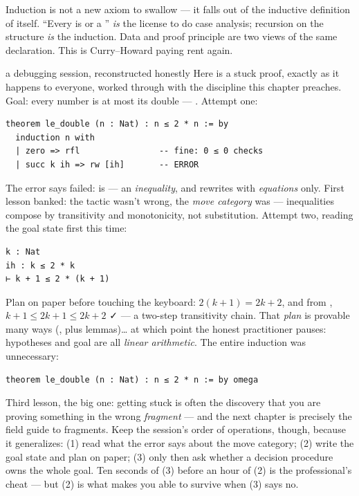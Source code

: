 \begin{aha}
Induction is not a new axiom to swallow --- it falls out of the inductive
definition of  itself. ``Every  is  or a
'' \emph{is} the license to do case analysis; recursion on the
structure \emph{is} the induction. Data and proof principle are two views of
the same declaration. This is Curry--Howard paying rent again.
\end{aha}

\begin{worked}{a debugging session, reconstructed honestly}
Here is a stuck proof, exactly as it happens to everyone, worked
through with the discipline this chapter preaches. Goal: every number
is at most its double --- . Attempt one:
\begin{lstlisting}[language=Lean]
theorem le_double (n : Nat) : n ≤ 2 * n := by
  induction n with
  | zero => rfl                -- fine: 0 ≤ 0 checks
  | succ k ih => rw [ih]       -- ERROR
\end{lstlisting}
The error says  failed:  is
 --- an \emph{inequality}, and  rewrites with
\emph{equations} only. First lesson banked: the tactic wasn't wrong,
the \emph{move category} was --- inequalities compose by transitivity
and monotonicity, not substitution. Attempt two, reading the goal
state first this time:
\begin{lstlisting}
k : Nat
ih : k ≤ 2 * k
⊢ k + 1 ≤ 2 * (k + 1)
\end{lstlisting}
Plan on paper before touching the keyboard: $2(k+1) = 2k + 2$, and from
, $k + 1 \le 2k + 1 \le 2k + 2$ ✓ --- a two-step transitivity
chain. That \emph{plan} is provable many ways
(,  plus lemmas)\dots{} at which
point the honest practitioner pauses: hypotheses and goal are all
\emph{linear arithmetic}. The entire induction was unnecessary:
\begin{lstlisting}[language=Lean]
theorem le_double (n : Nat) : n ≤ 2 * n := by omega
\end{lstlisting}
Third lesson, the big one: getting stuck is often the discovery that
you are proving something in the wrong \emph{fragment} --- and the next
chapter is precisely the field guide to fragments. Keep the session's
order of operations, though, because it generalizes: (1) read what the
error says about the move category; (2) write the goal state and plan
on paper; (3) only then ask whether a decision procedure owns the whole
goal. Ten seconds of (3) before an hour of (2) is the professional's
cheat --- but (2) is what makes you able to survive when (3) says no.
\end{worked}

